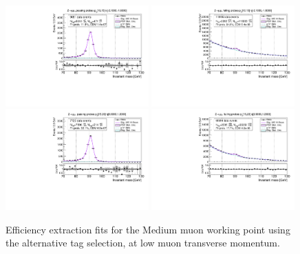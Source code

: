 \begin{figure}
\centering
\includegraphics[width=0.49\textwidth]{figures/Zmm_AltTag_pass_ptBin0_etaBin1.pdf}
\includegraphics[width=0.49\textwidth]{figures/Zmm_AltTag_fail_ptBin0_etaBin1.pdf}
\includegraphics[width=0.49\textwidth]{figures/Zmm_AltTag_pass_ptBin1_etaBin9.pdf}
\includegraphics[width=0.49\textwidth]{figures/Zmm_AltTag_fail_ptBin1_etaBin9.pdf}
\caption{Efficiency extraction fits for the Medium muon working point using the alternative tag selection, at low muon transverse momentum.}
\label{fig:ZmmAltAltTagFits1}
\end{figure}

